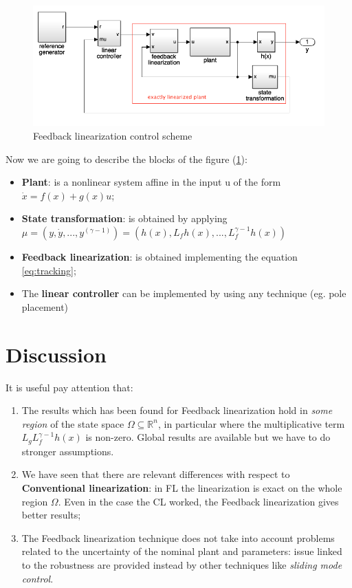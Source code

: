 \begin{figure}[h]
    \centering
    \includegraphics[scale=0.7]{NonLinearControl/images/FL_ControlScheme .png}
    \caption{Feedback linearization control scheme}
    \label{fig:FL_controlscheme}
\end{figure}

Now we are going to describe the blocks of the figure (\ref{fig:FL_controlscheme}):
\begin{itemize}
    \item \textbf{Plant}: is a nonlinear system affine in the input u of the form $\dot{x}=f(x)+g(x)u$;
    \item \textbf{State transformation}: is obtained by applying $\mu=(y, \dot{y}, ..., y^{(\gamma-1)})=(h(x), L_fh(x), ..., L_f^{\gamma-1}h(x))$
    \item \textbf{Feedback linearization}: is obtained implementing the equation \ref{eq:tracking}; 
    \item The \textbf{linear controller} can be implemented by using any technique (eg. pole placement)
\end{itemize}

\section{Discussion}
It is useful pay attention that:
\begin{enumerate}
    \item The results which has been found for Feedback linearization hold in \textit{some region} of the state space $\Omega\subseteq\mathbb{R}^n$, in particular where the multiplicative term $L_gL_f^{\gamma-1}h(x)$ is non-zero. Global results are available but we have to do stronger assumptions.
    \item We have seen that there are relevant differences with respect to \textbf{Conventional linearization}: in FL the linearization is exact on the whole region $\Omega$. Even in the case the CL worked, the Feedback linearization gives better results; 
    \item The Feedback linearization technique does not take into account problems related to the uncertainty of the nominal plant and parameters: issue linked to the robustness are provided instead by other techniques like \textit{sliding mode control}.
\end{enumerate}